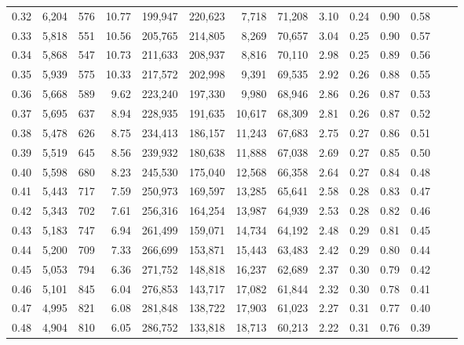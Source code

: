 \begin{tabular}{rrrrrrrrrrrrrr}
0.32 &  6,204 &    576 &    10.77 &  199,947 &  220,623 &   7,718 &  71,208 &  3.10 &  0.24 &  0.90 &      0.58 \\
0.33 &  5,818 &    551 &    10.56 &  205,765 &  214,805 &   8,269 &  70,657 &  3.04 &  0.25 &  0.90 &      0.57 \\
0.34 &  5,868 &    547 &    10.73 &  211,633 &  208,937 &   8,816 &  70,110 &  2.98 &  0.25 &  0.89 &      0.56 \\
0.35 &  5,939 &    575 &    10.33 &  217,572 &  202,998 &   9,391 &  69,535 &  2.92 &  0.26 &  0.88 &      0.55 \\
0.36 &  5,668 &    589 &     9.62 &  223,240 &  197,330 &   9,980 &  68,946 &  2.86 &  0.26 &  0.87 &      0.53 \\
0.37 &  5,695 &    637 &     8.94 &  228,935 &  191,635 &  10,617 &  68,309 &  2.81 &  0.26 &  0.87 &      0.52 \\
0.38 &  5,478 &    626 &     8.75 &  234,413 &  186,157 &  11,243 &  67,683 &  2.75 &  0.27 &  0.86 &      0.51 \\
0.39 &  5,519 &    645 &     8.56 &  239,932 &  180,638 &  11,888 &  67,038 &  2.69 &  0.27 &  0.85 &      0.50 \\
0.40 &  5,598 &    680 &     8.23 &  245,530 &  175,040 &  12,568 &  66,358 &  2.64 &  0.27 &  0.84 &      0.48 \\
0.41 &  5,443 &    717 &     7.59 &  250,973 &  169,597 &  13,285 &  65,641 &  2.58 &  0.28 &  0.83 &      0.47 \\
0.42 &  5,343 &    702 &     7.61 &  256,316 &  164,254 &  13,987 &  64,939 &  2.53 &  0.28 &  0.82 &      0.46 \\
0.43 &  5,183 &    747 &     6.94 &  261,499 &  159,071 &  14,734 &  64,192 &  2.48 &  0.29 &  0.81 &      0.45 \\
0.44 &  5,200 &    709 &     7.33 &  266,699 &  153,871 &  15,443 &  63,483 &  2.42 &  0.29 &  0.80 &      0.44 \\
0.45 &  5,053 &    794 &     6.36 &  271,752 &  148,818 &  16,237 &  62,689 &  2.37 &  0.30 &  0.79 &      0.42 \\
0.46 &  5,101 &    845 &     6.04 &  276,853 &  143,717 &  17,082 &  61,844 &  2.32 &  0.30 &  0.78 &      0.41 \\
0.47 &  4,995 &    821 &     6.08 &  281,848 &  138,722 &  17,903 &  61,023 &  2.27 &  0.31 &  0.77 &      0.40 \\
0.48 &  4,904 &    810 &     6.05 &  286,752 &  133,818 &  18,713 &  60,213 &  2.22 &  0.31 &  0.76 &      0.39 \\

\end{tabular}
